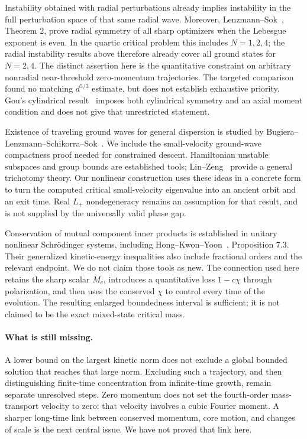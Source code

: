 \documentclass[11pt,a4paper]{article}
\theoremstyle{remark}\newtheorem{remark}[theorem]{Remark}
\begin{document}
Instability obtained with radial perturbations already implies
instability in the full perturbation space of that same radial wave.
Moreover, Lenzmann--Sok~\cite{LS}, Theorem 2, prove radial symmetry
of all sharp optimizers when the Lebesgue exponent is even. In the
quartic critical problem this includes $N=1,2,4$; the radial instability
results above therefore already cover all ground states for $N=2,4$.
The distinct assertion here is the quantitative constraint on arbitrary
nonradial near-threshold zero-momentum trajectories. The targeted
comparison found no matching $d^{5/3}$ estimate, but does not establish
exhaustive priority. Gou's cylindrical result~\cite{Gou} imposes both
cylindrical symmetry and an axial moment condition and does not give
that unrestricted statement.

Existence of traveling ground waves for general dispersion is studied
by Bugiera--Lenzmann--Schikorra--Sok~\cite{BLSS}. We include the
small-velocity ground-wave compactness proof needed for constrained
descent. Hamiltonian unstable subspaces and group bounds are established
tools; Lin--Zeng~\cite{LZ} provide a general trichotomy theory.
Our nonlinear construction uses these ideas in a concrete form to turn
the computed critical small-velocity eigenvalue into an ancient orbit
and an exit time. Real $L_+$ nondegeneracy remains an assumption for
that result, and is not supplied by the universally valid phase gap.

Conservation of mutual component inner products is established in
unitary nonlinear Schr\"odinger systems, including
Hong--Kwon--Yoon~\cite{HKY}, Proposition 7.3. Their generalized
kinetic-energy inequalities also include fractional orders and the
relevant endpoint. We do not claim those tools as new. The connection
used here retains the sharp scalar $M_c$, introduces a quantitative
loss $1-c\chi$ through polarization, and then uses the conserved
$\chi$ to control every time of the evolution. The resulting enlarged
boundedness interval is sufficient; it is not claimed to be the exact
mixed-state critical mass.

\paragraph{What is still missing.}
A lower bound on the largest kinetic norm does not exclude a global
bounded solution that reaches that large norm. Excluding such a
trajectory, and then distinguishing finite-time concentration from
infinite-time growth, remain separate unresolved steps. Zero momentum
does not set the fourth-order mass-transport velocity to zero: that
velocity involves a cubic Fourier moment. A sharper long-time link
between conserved momentum, core motion, and changes of scale is the
next central issue. We have not proved that link here.
\end{document}
